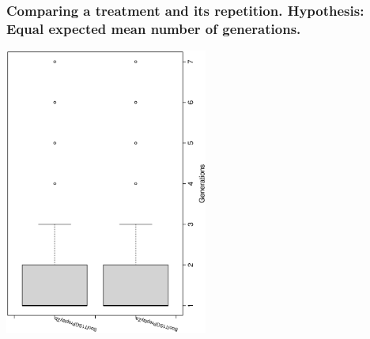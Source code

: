  \begin{frame}
 \frametitle{ Comparing a treatment and its repetition. Hypothesis: Equal expected mean number of generations. }
 \begin{center}
\includegraphics[width=0.5\textwidth, angle=-90]
{ExpCboxplottGenerations002.eps}
 \end{center}
 \label{ExpCboxplottGenerations002.eps}  
 \end{frame}

